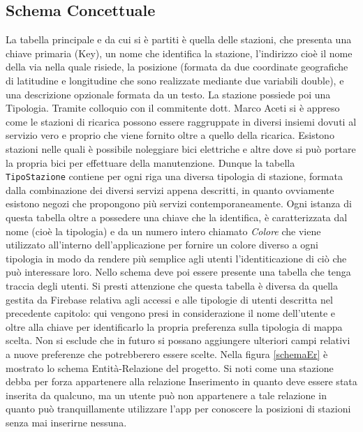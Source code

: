 \subsection{Schema Concettuale}
 La tabella principale e da cui si è partiti è
quella delle stazioni, che presenta una chiave primaria (Key), un nome che
identifica la stazione, l'indirizzo cioè il nome della via nella quale risiede, la
posizione (formata da due coordinate geografiche di latitudine e longitudine che
sono realizzate mediante due variabili double), e
una descrizione opzionale formata da un testo. La
stazione possiede poi una Tipologia. Tramite colloquio con il commitente dott.
Marco  Aceti si è appreso come le stazioni di ricarica possono essere
raggruppate
in diversi insiemi dovuti al servizio vero e proprio che viene fornito oltre a
quello della ricarica. Esistono stazioni nelle quali è possibile noleggiare bici
elettriche e altre dove si può portare la propria bici per effettuare della manutenzione.
Dunque la tabella \texttt{TipoStazione} contiene per ogni riga una diversa tipologia di
stazione, formata dalla combinazione dei diversi servizi appena descritti, in
quanto ovviamente esistono negozi che propongono più servizi contemporaneamente.
Ogni istanza di questa tabella oltre a possedere una chiave che la identifica,
è caratterizzata dal nome (cioè la tipologia) e da un numero intero chiamato
\textit{Colore} che viene utilizzato all'interno dell'applicazione per fornire un colore
diverso a ogni tipologia in modo da rendere più semplice agli utenti
l'identiticazione di ciò che può interessare loro. Nello schema deve poi essere
presente una tabella che tenga traccia degli utenti. Si presti attenzione che
questa tabella è diversa da quella gestita da Firebase relativa agli accessi e
alle tipologie di utenti descritta nel precedente capitolo: qui vengono presi in
considerazione il nome dell'utente e oltre alla chiave per identificarlo la
propria preferenza sulla tipologia di mappa scelta. Non si esclude che in futuro
si possano aggiungere ulteriori campi relativi a nuove preferenze che
potrebberero essere scelte. Nella figura \ref{schemaEr} è mostrato lo schema Entità-Relazione
del progetto. Si noti come una stazione debba per forza appartenere alla
relazione Inserimento in quanto deve essere stata inserita da qualcuno, ma un
utente può non appartenere a tale relazione in quanto può tranquillamente
utilizzare l'app per conoscere la posizioni di stazioni senza mai inserirne nessuna.

